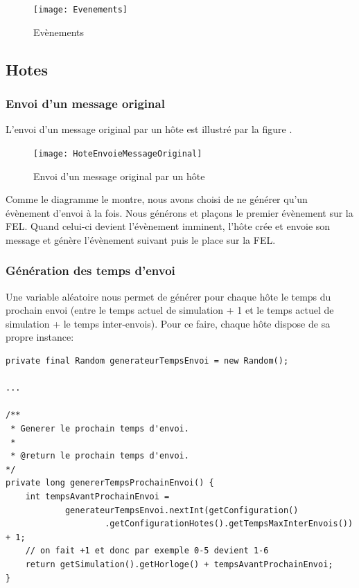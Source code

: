 \documentclass[a4paper,11pt]{article}
\begin{document}
\begin{figure}[h!t]
  \centering
    \texttt{[image: Evenements]}
  \caption{Evènements}
  \label{fig:evenements}
\end{figure}




\subsection{Hotes}


\subsubsection{Envoi d'un message original}
L'envoi d'un message original par un hôte est illustré par la figure . 

\begin{figure}[h!t]
  \centering
    \texttt{[image: HoteEnvoieMessageOriginal]}
  \caption{Envoi d'un message original par un hôte}
  \label{fig:hote-envoie-message-original}
\end{figure}

Comme le diagramme le montre, nous avons choisi de ne générer qu'un évènement d'envoi à la fois. Nous générons et plaçons le premier évènement sur la FEL. Quand celui-ci devient l'évènement imminent, l'hôte crée et envoie son message et génère l'évènement suivant puis le place sur la FEL.


\clearpage
\subsubsection*{Génération des temps d'envoi}
Une variable aléatoire nous permet de générer pour chaque hôte le temps du prochain envoi (entre le temps actuel de simulation + 1 et le temps actuel de simulation + le temps inter-envois). Pour ce faire, chaque hôte dispose de sa propre instance:

\begin{lstlisting}[caption=Génération des temps d'envoi]
private final Random generateurTempsEnvoi = new Random();

...

/**
 * Generer le prochain temps d'envoi.
 *
 * @return le prochain temps d'envoi.
*/
private long genererTempsProchainEnvoi() {
	int tempsAvantProchainEnvoi =
			generateurTempsEnvoi.nextInt(getConfiguration()
					.getConfigurationHotes().getTempsMaxInterEnvois()) + 1;
	// on fait +1 et donc par exemple 0-5 devient 1-6
	return getSimulation().getHorloge() + tempsAvantProchainEnvoi;
}
\end{lstlisting}
\end{document}
